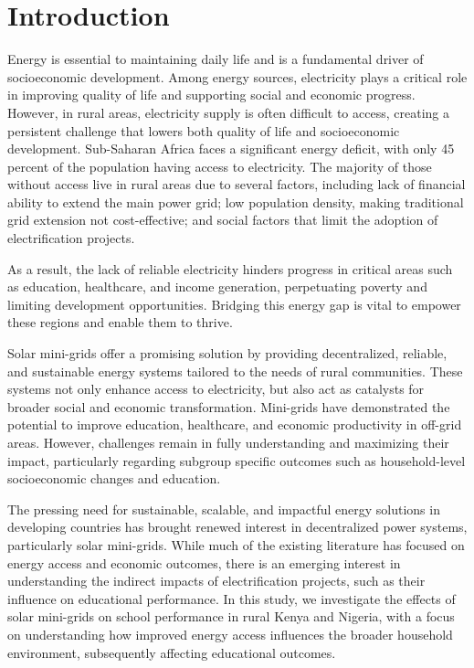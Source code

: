 \documentclass[journal=jacsat,manuscript=article]{achemso}
\begin{document}
\section{Introduction}
Energy is essential to maintaining daily life and is a fundamental driver of socioeconomic development. Among energy sources, electricity plays a critical role in improving quality of life and supporting social and economic progress. However, in rural areas, electricity supply is often difficult to access, creating a persistent challenge that lowers both quality of life and socioeconomic development. Sub-Saharan Africa faces a significant energy deficit, with only 45 percent of the population having access to electricity. The majority of those without access live in rural areas due to several factors, including lack of financial ability to extend the main power grid; low population density, making traditional grid extension not cost-effective; and social factors that limit the adoption of electrification projects.\cite{Zebra2021}

As a result, the lack of reliable electricity hinders progress in critical areas such as education, healthcare, and income generation, perpetuating poverty and limiting development opportunities.\cite{owid-energy-access} Bridging this energy gap is vital to empower these regions and enable them to thrive.

Solar mini-grids offer a promising solution by providing decentralized, reliable, and sustainable energy systems tailored to the needs of rural communities. These systems not only enhance access to electricity, but also act as catalysts for broader social and economic transformation. Mini-grids have demonstrated the potential to improve education, healthcare, and economic productivity in off-grid areas.\cite{Torero2015} However, challenges remain in fully understanding and maximizing their impact, particularly regarding subgroup specific outcomes such as household-level socioeconomic changes and education.

The pressing need for sustainable, scalable, and impactful energy solutions in developing countries has brought renewed interest in decentralized power systems, particularly solar mini-grids. While much of the existing literature has focused on energy access and economic outcomes, there is an emerging interest in understanding the indirect impacts of electrification projects, such as their influence on educational performance. In this study, we investigate the effects of solar mini-grids on school performance in rural Kenya and Nigeria, with a focus on understanding how improved energy access influences the broader household environment, subsequently affecting educational outcomes.
\end{document}
